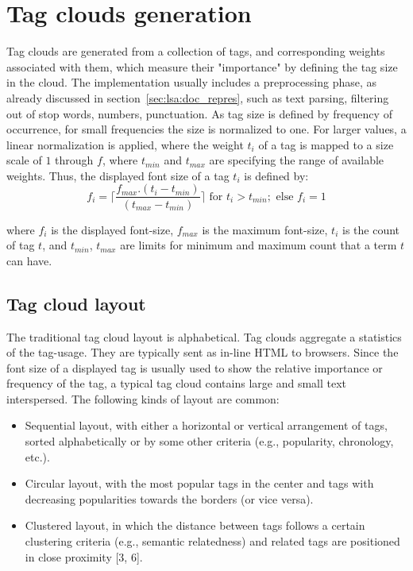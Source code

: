 \section{Tag clouds generation}
Tag clouds are generated from a collection of tags, and corresponding weights associated with them, which measure their "importance" by defining the tag size in the cloud. The implementation usually includes a preprocessing phase, as already discussed in section~\ref{sec:lsa:doc_repres}, such as text parsing, filtering out of stop words, numbers, punctuation. As tag size is defined by frequency of occurrence, for small frequencies the size is normalized to one. For larger values, a linear normalization is applied, where the weight $t_{i}$ of a tag is mapped to a size scale of $1$ through $f$, where $t_{min}$ and $t_{max}$ are specifying the range of available weights. Thus, the displayed font size of a tag $t_{i}$ is defined by: \\
\begin{equation}
f_{i} = \lceil {\frac{f_{max} . (t_{i} - t_{min})}{(t_{max} - t_{min})} }\rceil \mbox{ for }  t_{i} > t_{min}; \mbox{ else }  f_{i} = 1
\end{equation}

where $f_{i}$ is the displayed font-size, $f_{max}$ is the maximum font-size, $t_{i}$ is the count of tag $t$, and $t_{min}$, $t_{max}$ are limits for minimum and maximum count that a term $t$ can have. \\

\subsection{Tag cloud layout}
The traditional tag cloud layout is alphabetical. Tag clouds aggregate a statistics of the tag-usage. They are typically sent as in-line HTML to browsers. Since the font size of a displayed tag is usually used to show the relative importance or frequency of the tag, a typical tag cloud contains large and small text interspersed. The following kinds of layout are common: \\

\begin{itemize}
\item Sequential layout, with either a horizontal or vertical arrangement of tags, sorted
alphabetically or by some other criteria (e.g., popularity, chronology, etc.).

\item Circular layout, with the most popular tags in the center and tags with decreasing
popularities towards the borders (or vice versa).
 
\item Clustered layout, in which the distance between tags follows a certain clustering
criteria (e.g., semantic relatedness) and related tags are positioned in close
proximity [3, 6].
\end{itemize}



